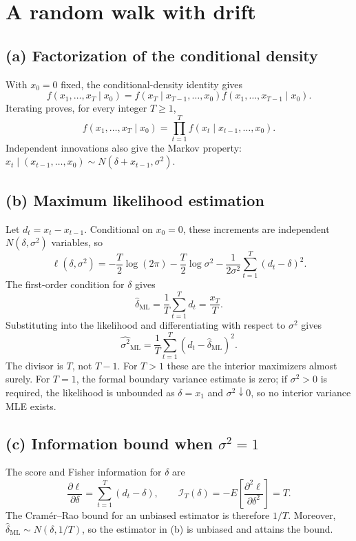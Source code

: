 \section{A random walk with drift}
\subsection*{(a) Factorization of the conditional density}
With $x_0=0$ fixed, the conditional-density identity gives
\[
f(x_1,\ldots,x_T\mid x_0)=
f(x_T\mid x_{T-1},\ldots,x_0)
f(x_1,\ldots,x_{T-1}\mid x_0).
\]
Iterating proves, for every integer $T\geq1$,
\[
\boxed{f(x_1,\ldots,x_T\mid x_0)
=\prod_{t=1}^{T}f(x_t\mid x_{t-1},\ldots,x_0).}
\]
Independent innovations also give the Markov property:
$x_t\mid(x_{t-1},\ldots,x_0)\sim N(\delta+x_{t-1},\sigma^2)$.

\subsection*{(b) Maximum likelihood estimation}
Let $d_t=x_t-x_{t-1}$. Conditional on $x_0=0$, these increments are
independent $N(\delta,\sigma^2)$ variables, so
\[
\ell(\delta,\sigma^2)
=-\frac T2\log(2\pi)-\frac T2\log\sigma^2
-\frac1{2\sigma^2}\sum_{t=1}^T(d_t-\delta)^2.
\]
The first-order condition for $\delta$ gives
\[
\boxed{\widehat\delta_{\mathrm{ML}}
=\frac1T\sum_{t=1}^Td_t=\frac{x_T}{T}.}
\]
Substituting into the likelihood and differentiating with respect to
$\sigma^2$ gives
\[
\boxed{\widehat{\sigma^2}_{\mathrm{ML}}
=\frac1T\sum_{t=1}^T(d_t-\widehat\delta_{\mathrm{ML}})^2.}
\]
The divisor is $T$, not $T-1$. For $T>1$ these are the interior
maximizers almost surely. For $T=1$, the formal boundary variance
estimate is zero; if $\sigma^2>0$ is required, the likelihood is
unbounded as $\delta=x_1$ and $\sigma^2\downarrow0$, so no interior
variance MLE exists.

\subsection*{(c) Information bound when $\sigma^2=1$}
The score and Fisher information for $\delta$ are
\[
\frac{\partial\ell}{\partial\delta}=\sum_{t=1}^T(d_t-\delta),
\qquad
\mathcal I_T(\delta)
=-E\left[\frac{\partial^2\ell}{\partial\delta^2}\right]=T.
\]
The Cram\'er--Rao bound for an unbiased estimator is therefore $1/T$.
Moreover,
$\widehat\delta_{\mathrm{ML}}\sim N(\delta,1/T)$,
so the estimator in (b) is unbiased and attains the bound.



